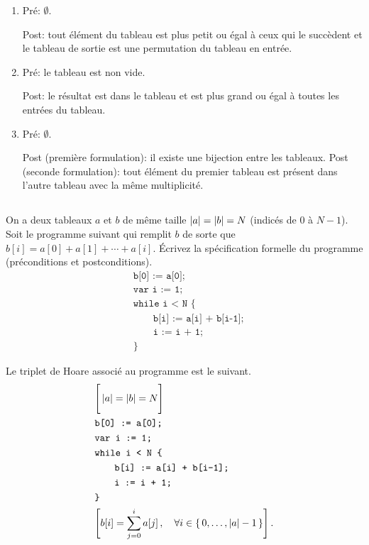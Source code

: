 \begin{solution}
\begin{enumerate}[label={\textbf{\alph*.}}]
	\item Pré: $\emptyset$.

	\noindent Post: tout élément du tableau est plus petit ou égal
	à ceux qui le succèdent et le tableau de sortie
	est une permutation du tableau en entrée.
	\item Pré: le tableau est non vide.

	\noindent Post: le résultat est dans le tableau
	et est plus grand ou égal à toutes les entrées du tableau.
	\item Pré: $\emptyset$.

	\noindent Post (première formulation):
	il existe une bijection entre les tableaux.
	Post (seconde formulation): tout élément du premier tableau
	est présent dans l'autre tableau avec la même multiplicité.
\end{enumerate}
\end{solution}

\subsection{}
On a deux tableaux $a$ et $b$ de même taille $\left\lvert a\right\lvert = \left\lvert b\right\lvert = N$
(indicés de $0$ à $N - 1$).
Soit le programme suivant qui remplit $b$
de sorte que $b[i] = a[0] + a[1] + \cdots + a[i]$.
Écrivez la spécification formelle du programme
(préconditions et postconditions).
\begin{align*}
&\texttt{b[0] := a[0];} \\
&\texttt{var i := 1;} \\
&\texttt{while i < N \{}\\
&\qquad\texttt{b[i] := a[i] + b[i-1];} \\
&\qquad\texttt{i := i + 1;} \\
&\texttt{\}}
\end{align*}

\begin{solution}
Le triplet de Hoare associé au programme est le suivant.
\begin{align*}
&\Bigg[\left\lvert a\right\lvert = \left\lvert b\right\lvert = N\Bigg] \\
&\texttt{b[0] := a[0];} \\
&\texttt{var i := 1;} \\
&\texttt{while i < N \{}\\
&\qquad\texttt{b[i] := a[i] + b[i-1];} \\
&\qquad\texttt{i := i + 1;} \\
&\texttt{\}} \\
&\Bigg[b[i] = \sum_{j=0}^i a[j]\,, \quad \forall i \in \{\,0, \ldots, \left\lvert a\right\lvert - 1\,\}\Bigg]\,.
\end{align*}
\end{solution}
